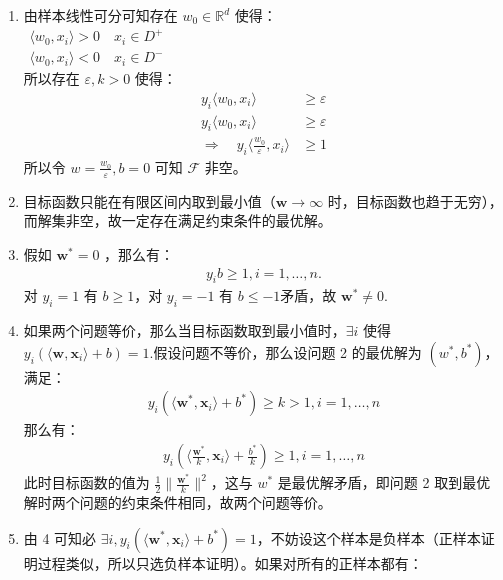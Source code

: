 \documentclass[11pt,letter,notitlepage]{article}
\begin{document}
\begin{solution}
	\heiti
	\begin{enumerate}
		\ \\
		\item
			由样本线性可分可知存在 $w_{0} \in \mathbb{R}^d$ 使得：\\
			$\begin{aligned} {\langle w_{0}, x_{i}\rangle > 0 \quad x_{i} \in D^{+}}  \\ {\langle w_{0}, x_{i}\rangle < 0   \quad x_{i} \in D^{-}} \end{aligned}$\\
			所以存在 $\varepsilon, k > 0$ 使得：\\
			\begin{align*}
				y_{i} \langle w_{0}, x_{i}\rangle &\geqslant \varepsilon \\ y_{i}\langle w_{0}, x_{i}\rangle &\geqslant \varepsilon \\  \Rightarrow \quad y_{i}\langle \frac{w_{0}}{\varepsilon}, x_{i}\rangle &\geqslant 1
			\end{align*}
			所以令 $w = \frac{w_{0}}{\varepsilon}, b = 0$ 可知 $\mathcal{F}$ 非空。
		\item 
			目标函数只能在有限区间内取到最小值（$\mathbf{w} \rightarrow \infty$ 时，目标函数也趋于无穷），而解集非空，故一定存在满足约束条件的最优解。
		\item
			假如 $\mathbf{w}^* = 0$ ，那么有：
			\begin{align*}
				y_i b \geqslant 1, i = 1,\ldots,n.
			\end{align*}
			对 $ y_i = 1$ 有 $b \geqslant 1$，对 $y_i = -1$ 有 $b \leqslant -1$矛盾，故 $\mathbf{w}^* \neq 0$.
		\item 如果两个问题等价，那么当目标函数取到最小值时，$\exists i$ 使得 $y_{i} ( \langle \textbf{w}, \textbf{x}_i \rangle + b ) = 1$.假设问题不等价，那么设问题 2 的最优解为 $(w^*, b^*)$，满足：
		\begin{align*}
			y_{i} ( \langle \textbf{w}^{*}, \textbf{x}_i \rangle + b^{*} ) \geqslant k > 1, i = 1,\ldots,n
		\end{align*}
		那么有：
		\begin{align*}
			y_{i} ( \langle \frac{\textbf{w}^{*}}{k}, \textbf{x}_i \rangle + \frac{b^*}{k} ) \geqslant 1, i = 1,\ldots,n
		\end{align*}
		此时目标函数的值为 $\frac{1}{2}\|\frac{\mathbf{w}^{*}}{k}\|^{2}$，这与 $w^*$ 是最优解矛盾，即问题 2 取到最优解时两个问题的约束条件相同，故两个问题等价。
		\item 由 4 可知必 $\exists i, y_{i} ( \langle \textbf{w}^{*}, \textbf{x}_i \rangle + b^{*} ) = 1$，不妨设这个样本是负样本（正样本证明过程类似，所以只选负样本证明）。如果对所有的正样本都有：

\end{enumerate}
\end{solution}
\end{document}
